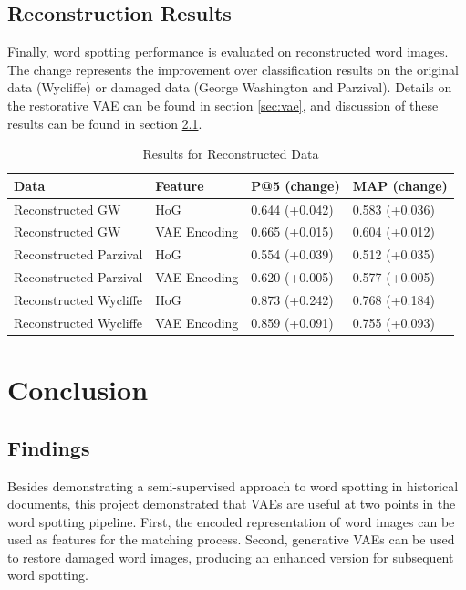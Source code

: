 \documentclass[final]{ukthesis}
\begin{document}
%
%
\section{Reconstruction Results}
\label{sec:reconstruction-results}

Finally, word spotting performance is evaluated on reconstructed word images. The change represents the improvement over classification results on the original data (Wycliffe) or damaged data (George Washington and Parzival). Details on the restorative VAE can be found in section \ref{sec:vae}, and discussion of these results can be found in section \ref{sec:findings}.

\begin{table}[h]
\centering
\begin{tabular}{llll}
\textbf{Data}  & \textbf{Feature} & \textbf{P@5 (change)} & \textbf{MAP (change)} \\
\hline
Reconstructed GW    & HoG			& 0.644 (+0.042)          & 0.583 (+0.036)         \\
Reconstructed GW    & VAE Encoding 	& 0.665 (+0.015)         & 0.604 (+0.012)         \\
Reconstructed Parzival & HoG                     & 0.554 (+0.039)         & 0.512 (+0.035)         \\
Reconstructed Parzival & VAE Encoding 	& 0.620 (+0.005)         & 0.577 (+0.005)         \\
Reconstructed Wycliffe & HoG                     & 0.873 (+0.242)         & 0.768 (+0.184)         \\
Reconstructed Wycliffe & VAE Encoding 	& 0.859 (+0.091)         & 0.755 (+0.093)         \\
\end{tabular}
\caption{Results for Reconstructed Data}
\label{tab:reconstructed-results}
\end{table}





%
%
%
\chapter{Conclusion}

\section{Findings}
\label{sec:findings}
Besides demonstrating a semi-supervised approach to word spotting in historical documents, this project demonstrated that VAEs are useful at two points in the word spotting pipeline. First, the encoded representation of word images can be used as features for the matching process. Second, generative VAEs can be used to restore damaged word images, producing an enhanced version for subsequent word spotting.
\end{document}
